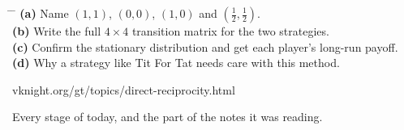 \hspace{0.6cm}
\begin{minipage}{0.92\linewidth}
{\large
\begin{tabbing}
\hspace{1.2cm} \= \hspace{17cm} \= \kill
\textbf{(a)} \> Name \((1,1)\), \((0,0)\), \((1,0)\) and
  \(\left(\tfrac12, \tfrac12\right)\). \> [3]\\[0.55em]
\textbf{(b)} \> Write the full \(4 \times 4\) transition matrix for the two
  strategies. \> [7]\\[0.55em]
\textbf{(c)} \> Confirm the stationary distribution and get each player's
  long-run payoff. \> [7]\\[0.55em]
\textbf{(d)} \> Why a strategy like Tit For Tat needs care with this
  method. \> [8]
\end{tabbing}}
\end{minipage}

\vspace{1.2cm}

\begin{center}
{\large\color{inkgrey} vknight.org/gt/topics/direct-reciprocity.html}
\end{center}

\newpage
\nonotes
{}

\vspace{0.3cm}

{\large Every stage of today, and the part of the notes it was reading.}

\vspace{0.35cm}

